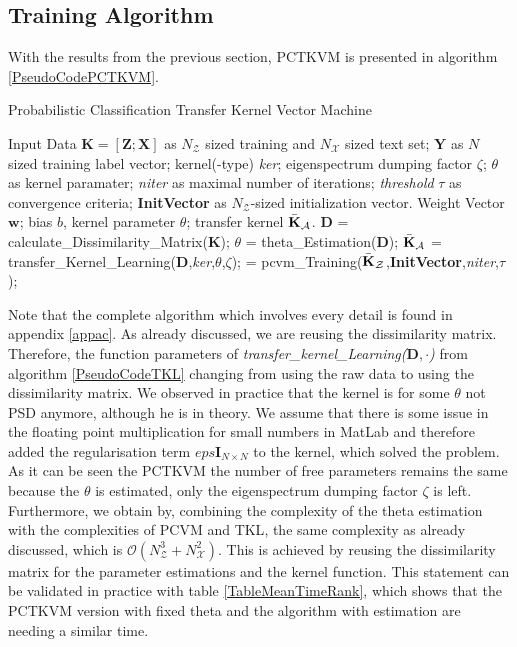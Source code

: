 \subsection{Training Algorithm}\label{InSubSecTraining}
With the results from the previous section, \acs{PCTKVM} is presented in algorithm \ref{PseudoCodePCTKVM}.
\begin{algorithm}
	\caption{Probabilistic Classification Transfer Kernel Vector Machine }\label{PseudoCodePCTKVM}	
	\begin{algorithmic}[1]
		\Require Input Data $\mathbf{K} = [\mathbf{Z};\mathbf{X}]$ as $N_\mathcal{Z}$ sized training and $N_\mathcal{X}$ sized text set; $\mathbf{Y}$ as $N$ sized training label vector; kernel(-type) \textit{ker}; eigenspectrum dumping factor $\zeta$; $\theta$ as kernel paramater; \textit{niter} as maximal number of iterations; \textit{threshold} $\tau$ as convergence criteria; \textbf{InitVector} as $N_\mathcal{Z}$-sized initialization vector.
		\Ensure Weight Vector $\mathbf{w}$; bias $b$, kernel parameter $\theta$; transfer kernel $\bar{\mathbf{K}}_\mathcal{A}$.
		\State $\mathbf{D}$ = calculate\_Dissimilarity\_Matrix($\mathbf{K}$);
		\State $\theta$ = theta\_Estimation($\mathbf{D}$);  
		\State $\bar{\mathbf{K}}_\mathcal{A}$ = transfer\_Kernel\_Learning($\mathbf{D}$,\textit{ker},$\theta$,$\zeta$); 
		\State [$\mathbf{w}$,$b$] = pcvm\_Training($\bar{\mathbf{K}}_\mathcal{Z}$,\textbf{InitVector},\textit{niter},$\tau$); 
	\end{algorithmic}
\end{algorithm}
Note that the complete algorithm which involves every detail is found in appendix \ref{appac}. As already discussed, we are reusing the dissimilarity matrix. Therefore, the function parameters of \textit{transfer\_kernel\_Learning($\mathbf{D},\cdot$)} from algorithm \ref{PseudoCodeTKL} changing from using the raw data to using the dissimilarity matrix.  
We observed in practice that the kernel is for some $\theta$ not \acs{PSD} anymore, although he is in theory.\cite{Long.2015}
We assume that there is some issue in the floating point multiplication for small numbers in MatLab and therefore added the regularisation term $eps\mathbf{I}_{N\times N}$ to the kernel, which solved the problem.\\
As it can be seen the \acs{PCTKVM} the number of free parameters remains the same because the $\theta$ is estimated, only the eigenspectrum dumping factor $\zeta$ is left.
Furthermore, we obtain by, combining the complexity of the theta estimation with the complexities of \acs{PCVM} and \acs{TKL}, the same complexity as already discussed, which is $\mathcal{O}(N_\mathcal{Z}^3+N_\mathcal{X}^2)$.
This is achieved by reusing the dissimilarity matrix for the parameter estimations and the kernel function.
This statement can be validated in practice with table \ref{TableMeanTimeRank}, which shows that the \acs{PCTKVM} version with fixed theta and the algorithm with estimation are needing a similar time.
